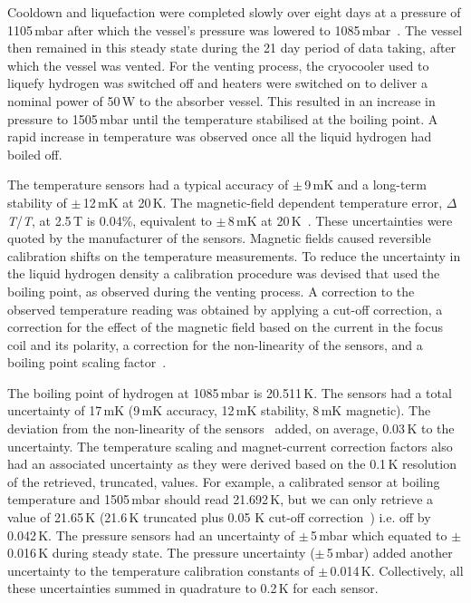 Cooldown and liquefaction were completed slowly over eight days at a
pressure of 1105\,mbar after which the vessel's pressure was lowered to
1085\,mbar~\cite{1748-0221-13-09-T09008}.
The vessel then remained in this steady state during the 21 day period of data taking, after which the vessel was vented. For the venting process,
the cryocooler used to liquefy hydrogen was
switched off and heaters were switched on to deliver a nominal power
of 50\,W to the absorber vessel.
This resulted in an increase in pressure to 1505\,mbar until the
temperature stabilised at the boiling point.
A rapid increase in temperature was observed once all the
liquid hydrogen had boiled off. 

The temperature sensors had a typical accuracy of
$\mathrm{\pm}$\,9\,mK and a long-term stability of
$\mathrm{\pm}$\,12\,mK at 20\,K.
The magnetic-field dependent temperature error, $\Delta$\textit{T}/\textit{T}, at 2.5\,T is 0.04\%,
equivalent to $\mathrm{\pm}$\,8\,mK at
20\,K~\cite{TemperatureMeasurement}.
These uncertainties were quoted by the manufacturer of the sensors.
Magnetic fields caused reversible calibration shifts on the temperature
measurements.
To reduce the uncertainty in the liquid hydrogen density a calibration
procedure was devised that used the boiling point, as observed
during the venting process.
A correction to the observed temperature reading was obtained by
applying a cut-off correction, a correction for the effect of the
magnetic field based on the current in the focus coil and its
polarity, a correction for the non-linearity of the sensors, and a 
boiling point scaling factor~\cite{NOTE524}.  
 
The boiling point of hydrogen at 1085\,mbar is 20.511\,K.
The sensors had a total uncertainty of 17\,mK (9\,mK accuracy, 12\,mK
stability, 8\,mK magnetic).
The deviation from the non-linearity of the sensors~\cite{TemperatureMeasurement} added, on average,
0.03\,K to the uncertainty.
The temperature scaling and magnet-current correction factors also
had an associated uncertainty as
they were derived based on the 0.1\,K resolution of the retrieved, truncated, values.
For example, a calibrated sensor at boiling temperature and 1505\,mbar
should read 21.692\,K, but we can only retrieve a value of
21.65\,K (21.6\,K truncated plus 0.05 K cut-off correction~\cite{NOTE524}) i.e.
off by 0.042\,K.
The pressure sensors had an uncertainty of $\mathrm{\pm}$\,5\,mbar
which equated to $\mathrm{\pm}$\,0.016\,K during steady state.
The pressure uncertainty ($\mathrm{\pm}$\,5\,mbar) added another
uncertainty to the temperature calibration constants of
$\mathrm{\pm}$\,0.014\,K.
Collectively, all these uncertainties summed in quadrature to 0.2\,K for
each sensor.
 
